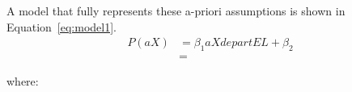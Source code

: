 A model that fully represents these a-priori assumptions is shown in Equation~\ref{eq:model1}.
\begin{align}
    P(aX) &= \beta_1 aXdepartEL + \beta_2 \\
    &=
\end{align}

where:
